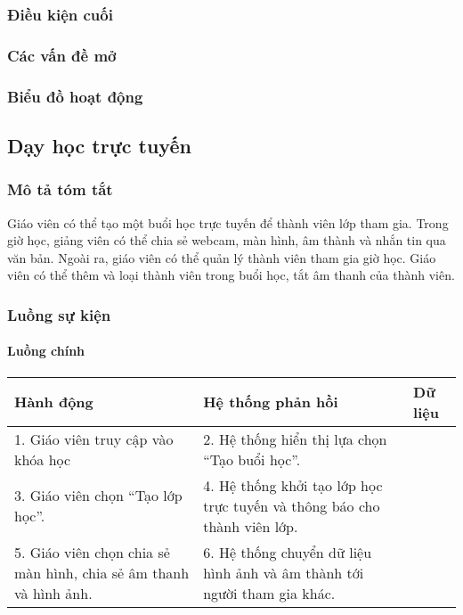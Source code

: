 \documentclass[./../main_file.tex]{subfiles}
\begin{document}
\subsubsection{Điều kiện cuối}
\subsubsection{Các vấn đề mở}
\subsubsection{Biểu đồ hoạt động}

\subsection{Dạy học trực tuyến}
\subsubsection{Mô tả tóm tắt}
Giáo viên có thể tạo một buổi học trực tuyến để thành viên lớp tham gia. Trong giờ học, giảng viên có thể chia sẻ webcam, màn hình, âm thành và nhắn tin qua văn bản. Ngoài ra, giáo viên có thể quản lý thành viên tham gia giờ học. Giáo viên có thể thêm và loại thành viên trong buổi học, tắt âm thanh của thành viên.

\subsubsection{Luồng sự kiện}
\paragraph{Luồng chính}
\begin{table}[H]
				\begin{tabular}{|p{.33\textwidth}|p{}|p{}|}
		\hline
		\textbf{Hành động}              & \textbf{Hệ thống phản hồi}                 & \textbf{Dữ liệu} \\ \hline
		1. Giáo viên truy cập vào khóa học & 2. Hệ thống hiển thị lựa chọn “Tạo buổi học”. &                  \\ \hline
		3. Giáo viên chọn “Tạo lớp học”.                                  & 4. Hệ thống khởi tạo lớp học trực tuyến và thông báo cho thành viên lớp. &  \\ \hline
		5. Giáo viên chọn chia sẻ màn hình, chia sẻ âm thanh và hình ảnh. & 6. Hệ thống chuyển dữ liệu hình ảnh và âm thành tới người tham gia khác. &  \\ \hline
	\end{tabular}
\end{table}
\end{document}

